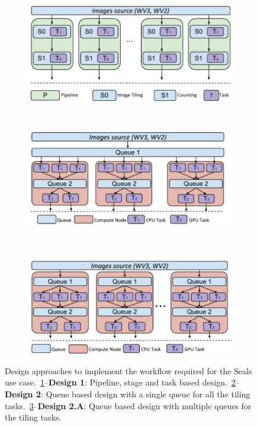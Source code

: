 \begin{figure}[ht!]
	\centering
	\begin{subfigure}[b]{0.32\textwidth}
		\includegraphics[width=\linewidth]{figures/designs/SealsDesign1.pdf}
		\caption{}
		\label{fig:seals_design1}
	\end{subfigure}%
	~ 
	\begin{subfigure}[b]{0.32\textwidth}
		\includegraphics[width=\linewidth]{figures/designs/SealsDesign2.pdf}
		\caption{}\label{fig:seals_design2}
	\end{subfigure}%
	~ 
	\begin{subfigure}[b]{0.32\textwidth}
		\includegraphics[width=\linewidth]{figures/designs/SealsDesign3.pdf}
		\caption{}\label{fig:seals_design3}
	\end{subfigure}
	\caption{Design approaches to implement the workflow required for the
		Seals use case.~\ref{fig:seals_design1}--\textbf{Design 1}: Pipeline,
		stage and task based design.~\ref{fig:seals_design2}--\textbf{Design 2}:
		Queue based design with a single queue for all the tiling
		tasks.~\ref{fig:seals_design3}--\textbf{Design 2.A}: Queue based design
		with multiple queues for the tiling tasks.}\label{fig:designs}
\end{figure}

